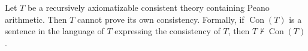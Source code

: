 Let $T$ be a recursively axiomatizable consistent theory containing Peano arithmetic. Then $T$ cannot prove its own consistency. Formally, if $\operatorname{Con}(T)$ is a sentence in the language of $T$ expressing the consistency of $T$, then $T \not\vdash \operatorname{Con}(T)$.
